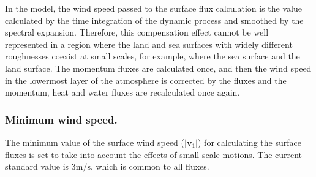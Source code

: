 In the model, the wind speed passed to the surface flux calculation is
the value calculated by the time integration of the dynamic process and
smoothed by the spectral expansion. Therefore, this compensation effect
cannot be well represented in a region where the land and sea surfaces
with widely different roughnesses coexist at small scales, for example,
where the sea surface and the land surface. The momentum fluxes are
calculated once, and then the wind speed in the lowermost layer of the
atmosphere is corrected by the fluxes and the momentum, heat and water
fluxes are recalculated once again.

\hypertarget{minimum-wind-speed.}{%
\subsubsection{Minimum wind speed.}\label{minimum-wind-speed.}}

The minimum value of the surface wind speed (\(|{\mathbf{v}}_1|\)) for
calculating the surface fluxes is set to take into account the effects
of small-scale motions. The current standard value is
\(3 \mathrm{m/s}\), which is common to all fluxes.
